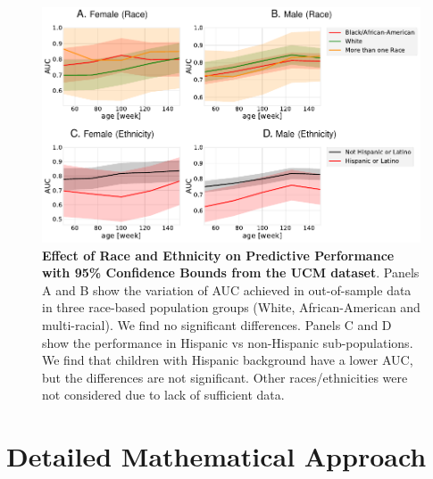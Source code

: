 \documentclass[onecolumn,,10pt]{IEEEtran}
\renewcommand{\captionN}[1]{\caption{\color{CadetBlue4!80!black} \sffamily \fontsize{9}{10}\selectfont #1  }}
\newif\ifFIGS
\begin{document}
{\HCOL
\ifFIGS
\begin{figure}[!ht]
  \centering
  \includegraphics[width=\textwidth]{Figures/raceeth}

  \captionN{\HCOL \textbf{Effect of Race and Ethnicity on Predictive Performance with 95\% Confidence Bounds from the UCM dataset}. Panels A and B show the variation of AUC achieved in out-of-sample data in three race-based population groups (White, African-American and multi-racial). We find no significant differences. Panels C and D show the performance in Hispanic vs non-Hispanic sub-populations. We find that children with Hispanic background have a lower AUC, but the differences are not significant. Other races/ethnicities were not considered due to lack of sufficient data. }\label{figrace}
    \vspace{-5pt}

  \end{figure}
  }

\section{Detailed Mathematical Approach}\label{sec:mathdetails}
 
\end{document}

